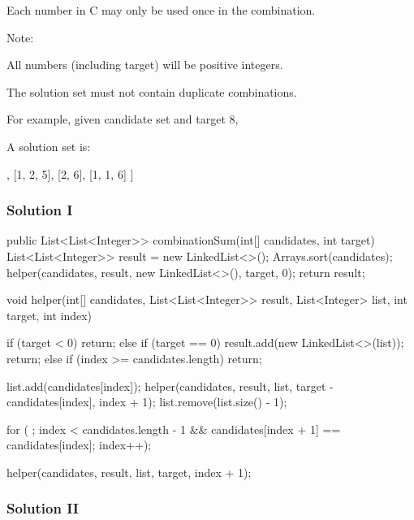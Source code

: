 Each number in C may only be used once in the combination.

Note:

All numbers (including target) will be positive integers.

The solution set must not contain duplicate combinations.

For example, given candidate set \code{[10, 1, 2, 7, 6, 1, 5]} and target 8,

A solution set is:
\begin{Code}
[
  [1, 7],
  [1, 2, 5],
  [2, 6],
  [1, 1, 6]
]
\end{Code}

\subsubsection{Solution I}

\begin{Code}
public List<List<Integer>> combinationSum(int[] candidates, int target) {
    List<List<Integer>> result = new LinkedList<>();
    Arrays.sort(candidates);
    helper(candidates, result, new LinkedList<>(), target, 0);
    return result;
}

void helper(int[] candidates, List<List<Integer>> result, List<Integer> list, int target, int index) {
    if (target < 0) {
        return;
    } else if (target == 0) {
        result.add(new LinkedList<>(list));
        return;
    } else if (index >= candidates.length) {
        return;
    }

    list.add(candidates[index]);
    helper(candidates, result, list, target - candidates[index], index + 1);
    list.remove(list.size() - 1);

    for ( ; index < candidates.length - 1 && candidates[index + 1] == candidates[index]; index++);

    helper(candidates, result, list, target, index + 1);
}
\end{Code}

\newpage

\subsubsection{Solution II}


